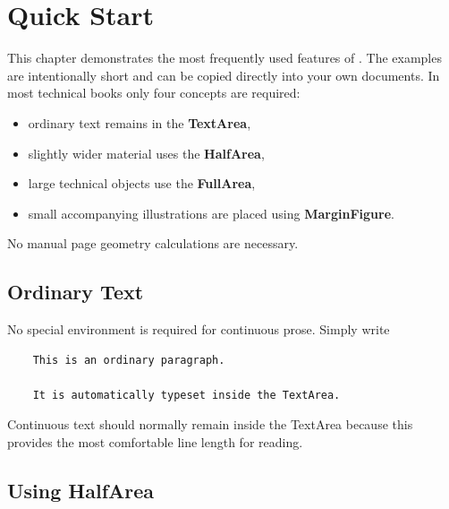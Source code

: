 \documentclass[
11pt,
a4paper,
oneside
]{scrbook}
\begin{document}

\chapter{Quick Start}
\label{chap:quickstart}
\begin{MarginFigure}
\end{MarginFigure}
This chapter demonstrates the most frequently used features of
\mdlayout{}.
The examples are intentionally short and can be copied directly into your own
documents.
In most technical books only four concepts are required:
\begin{itemize}
	\item ordinary text remains in the \textbf{TextArea},
	\item slightly wider material uses the \textbf{HalfArea},
	\item large technical objects use the \textbf{FullArea},
	\item small accompanying illustrations are placed using
	\textbf{MarginFigure}.
\end{itemize}
No manual page geometry calculations are necessary.


\section{Ordinary Text}

No special environment is required for continuous prose.
Simply write
\begin{verbatim}
	This is an ordinary paragraph.
	
	It is automatically typeset inside the TextArea.
\end{verbatim}
Continuous text should normally remain inside the TextArea because this
provides the most comfortable line length for reading.


\section{Using HalfArea}
\end{document}
